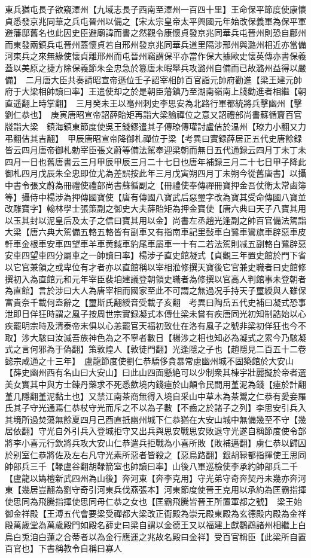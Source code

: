 東兵猶屯長子欲窺澤州【九域志長子西南至澤州一百四十里】王命保平節度使康懷貞悉發京兆同華之兵屯晉州以備之【宋太宗皇帝太平興國元年始改保義軍為保平軍避藩邸舊名也此因史臣避廟諱而書之然觀令康懷貞發京兆同華兵屯晉州則恐自鄜州而東發兩鎮兵屯晉州蓋懷貞若自邢州發京兆同華兵道里隔涉邢州與潞州相近亦當備河東兵之來無緣使懷貞離邢州而屯晉州竊謂保平亦當作保大據歐史懷英傳亦書保義蓋以美原之捷方除保義節朱全忠急於簒唐未暇舉兵攻潞州自備而已故潞州益得以嚴備】　二月唐大臣共奏請昭宣帝遜位壬子詔宰相帥百官詣元帥府勸進【梁王建元帥府于大梁相帥讀曰率】王遣使却之於是朝臣藩鎮乃至湖南嶺南上牋勸進者相繼【朝直遥翻上時掌翻】　三月癸未王以亳州刺史李思安為北路行軍都統將兵擊幽州【擊劉仁恭也】　庚寅唐昭宣帝詔薛貽矩再詣大梁諭禪位之意又詔禮部尚書蘇循齎百官牋詣大梁　鎮海鎮東節度使吳王錢鏐遣其子傳璙傳瓘討盧佶於温州【璙力小翻又力弔翻佶其吉翻】　甲辰唐昭宣帝降御札禪位于梁【考異曰實録薛居正五代史唐餘録皆云四月唐帝御札勅宰臣張文蔚等備法駕奉迎梁朝而無日五代通録云四月丁未丁未四月一日也舊唐書云三月甲辰甲辰三月二十七日也唐年補録三月二十七日甲子降此御札四月戊辰朱全忠即位尤為差誤按此年三月戊寅朔四月丁未朔今從舊唐書】以攝中書令張文蔚為冊禮使禮部尚書蘇循副之【冊禮使奉傳禪冊寶押金吾仗衛太常鹵簿等】攝侍中楊涉為押傳國寶使【唐有傳國八寶武后惡璽字改為寶其受命傳國八寶並改雕寶字】翰林學士張策副之御史大夫薛貽矩為押金寶使【唐六典曰天子八寶其用以玉其封以泥皇后及太子之信曰寶其用以金】尚書左丞趙光逢副之帥百官備法駕詣大梁【唐六典大駕備五輅五輅皆有副車又有指南車記里鼔車白鷺車鸞旗車辟惡車皮軒車金根車安車四望車羊車黄鉞車豹尾車屬車一十有二若法駕則减五副輅白鷺辟惡安車四望車四分屬車之一帥讀曰率】楊涉子直史館凝式【貞觀三年置史館於門下省以它官兼領之或卑位有才者亦以直館稱以宰相涖修撰天寶後它官兼史職者曰史館修撰初入為直館元和元年宰臣裴垍建議登朝領史職者為修撰以官高人判館事未登朝者為直館】言於涉曰大人為唐宰相而國家至此不可謂之無過况手持天子璽綬與人雖保富貴奈千載何盍辭之【璽斯氏翻綬音受載子亥翻　考異曰陶岳五代史補曰凝式恐事泄即日佯狂時謂之風子按周世宗實録凝式本傳仕梁未嘗有疾唐同光初知制誥始以心疾罷明宗時及清泰帝末俱以心恙罷官天福初致仕在洛有風子之號非梁初佯狂也今不取】涉大駭曰汝滅吾族神色為之不寧者數日【楊涉之相也知必為凝式之累今乃駭凝式之言何邪為于偽翻】策敦煌人【敦徒門翻】光逢隱之子也【趙隱見二百五十二卷懿宗咸通之十三年】　盧龍節度使劉仁恭驕侈貪暴常慮幽州城不固築館於大安山【薛史幽州西有名山曰大安山】曰此山四面懸絶可以少制衆其棟宇壯麗擬於帝者選美女實其中與方士鍊丹藥求不死悉歛境内錢瘞於山顛令民間用堇泥為錢【瘞於計翻堇几隱翻堇泥黏土也】又禁江南茶商無得入境自采山中草木為茶鬻之仁恭有愛妾羅氏其子守光通焉仁恭杖守光而斥之不以為子數【不齒之於諸子之列】李思安引兵入其境所過焚蕩無餘夏四月己酉直扺幽州城下仁恭猶在大安山城中無備幾至不守【幾居依翻】守光自外引兵入登城拒守又出兵與思安戰思安敗退守光遂自稱節度使令部將李小喜元行欽將兵攻大安山仁恭遣兵拒戰為小喜所敗【敗補邁翻】虜仁恭以歸囚於别室仁恭將佐及左右凡守光素所惡者皆殺之【惡烏路翻】銀胡䩮都指揮使王思同帥部兵三千【䩮盧谷翻胡䩮箭室也帥讀曰率】山後八軍巡檢使李承約帥部兵二千【盧龍以媯檀新武四州為山後】奔河東【奔李克用】守光弟守奇奔契丹未幾亦奔河東【幾居豈翻為劉守奇引河東兵伐燕張本】河東節度使晉王克用以承約為匡霸指揮使思同為飛騰指揮使思同母仁恭之女也【匡霸飛騰皆晉王所置軍都之號】　梁王始御金祥殿【王溥五代會要梁受禪都大梁改正衙殿為崇元殿東殿為玄德殿内殿為金祥殿萬歲堂為萬歲殿門如殿名薛史曰梁自謂以金德王又以福建上獻鸚鵡諸州相繼上白烏白兎洎白蓮之合蒂者以為金行應運之兆故名殿曰金祥】受百官稱臣【此梁所自置百官也】下書稱教令自稱曰寡人